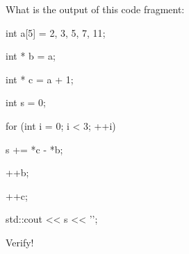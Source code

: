 What is the output of this code fragment:



\begin{consolethree}[escapeinside=||]

int a[5] = {2, 3, 5, 7, 11};

int * b = a;

int * c = a + 1;

int s = 0;

for (int i = 0; i < 3; ++i)

{

    s += *c - *b;

    ++b;

    ++c;

}

std::cout << s << '\n';

\end{consolethree}



Verify!

